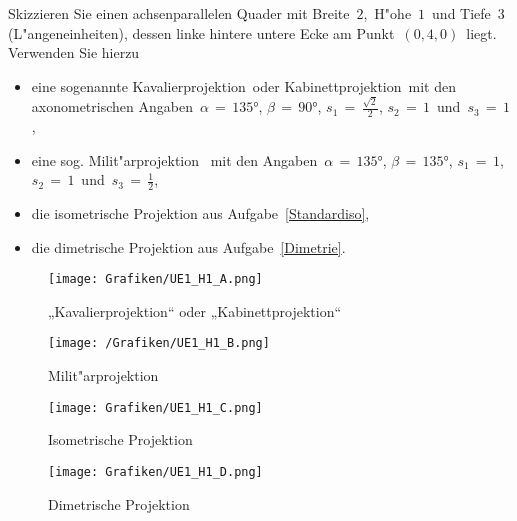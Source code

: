 
\small
\begin{Aufgabe}
Skizzieren Sie einen achsenparallelen Quader mit Breite \,$2$,\, H"ohe \,$1$\, und Tiefe \,$3$\, (L"angeneinheiten), dessen linke hintere untere Ecke am Punkt \,$(0,4,0)$\, liegt. Verwenden Sie hierzu
    \begin{itemize}
    \item eine sogenannte \glqq Kavalierprojektion\grqq\ oder \glqq Kabinettprojektion\grqq\ mit den axonometrischen Angaben \,$\alpha \,=\, \ang{135}$,\; $\beta \,= \,\ang{90}$,\; $s_1 \,=\, \tfrac{\sqrt{2}}{2}$,\; $s_2 \,=\, 1$\, und\, $s_3\,=\, 1$,
     \item eine sog. \glqq Milit"arprojektion \grqq\ mit den Angaben \,$\alpha\,= \,\ang{135}$, \;$\beta\,=\, \ang{135}$,\; $s_1 \,= \,1$,\, $s_2 \,=\, 1$\, und\, $s_3 \,=\, \tfrac{1}{2}$,
     \item die isometrische Projektion aus Aufgabe~\ref{Standardiso},
     \item die dimetrische Projektion aus Aufgabe~\ref{Dimetrie}.
\end{itemize}
\end{Aufgabe}
%
\begin{Loesung}

\begin{figure}[H]
	\centering
	\texttt{[image: Grafiken/UE1\_H1\_A.png]}
	\caption{ „Kavalierprojektion“ oder „Kabinettprojektion“}
	\label{fig:H1_A}
\end{figure}

\begin{figure}[H]
	\centering
	\texttt{[image: /Grafiken/UE1\_H1\_B.png]}
	\caption{ Milit"arprojektion}
	\label{fig:H1_B}
\end{figure}

\begin{figure}[H]
	\centering
	\texttt{[image: Grafiken/UE1\_H1\_C.png]}
	\caption{ Isometrische Projektion}
	\label{fig:H1_C}
\end{figure}

\begin{figure}[H]
	\centering
	\texttt{[image: Grafiken/UE1\_H1\_D.png]}
	\caption{ Dimetrische Projektion}
	\label{fig:H1_D}
\end{figure}
\end{Loesung}
